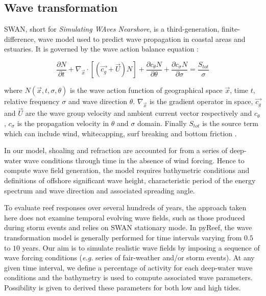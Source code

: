 \documentclass[default,jgrga]{agutex2015}
\begin{document}
\begin{article}
\subsection{Wave transformation}

SWAN, short for \textit{Simulating WAves Nearshore}, is a third-generation, finite-difference, wave model used to predict wave propagation in coastal areas and estuaries. It is governed by the wave action balance equation \citep{Bretherton68, Hasselmann73, Holthuijsen93, Booij99}:

\begin{equation}
 \frac{\partial N}{\partial t}+\nabla_{\vec{x}} \cdot \left[ \left( \vec{c_g} + \vec{U} \right) N \right] + \frac{\partial c_{\theta}N}{\partial \theta} + \frac{\partial c_{\sigma}N}{\partial \sigma} = \frac{S_{tot}}{\sigma}
\end{equation}

\noindent where $N(\vec{x},t,\sigma,\theta)$ is the wave action function of geographical space $\vec{x}$, time $t$, relative frequency $\sigma$ and wave direction $\theta$. $\nabla_{\vec{x}}$ is the gradient operator in space, $\vec{c_g}$ and $\vec{U}$ are the wave group velocity and ambient current vector respectively and $c_{\theta}$, $c_{\sigma}$ is the propagation velocity in $\theta$ and $\sigma$ domain. Finally $S_{tot}$ is the source term which can include wind, whitecapping, surf breaking and bottom friction \citep{Booij99}.

\noindent In our model, shoaling and refraction are accounted for from a series of deep-water wave conditions through time in the absence of wind forcing. Hence to compute wave field generation, the model requires bathymetric conditions and definitions of offshore significant wave height, characteristic period of the energy spectrum and wave direction and associated spreading angle.

\noindent To evaluate reef responses over several hundreds of years, the approach taken here does not examine temporal evolving wave fields, such as those produced during storm events and relies on SWAN stationary mode. In pyReef, the wave transformation model is generally performed for time intervals varying from $0.5$ to $10$ years. Our aim is to simulate realistic wave fields by imposing a sequence of wave forcing conditions (\textit{e.g.} series of fair-weather and/or storm events). At any given time interval, we define a percentage of activity for each deep-water wave conditions and the bathymetry is used to compute associated wave parameters. Possibility is given to derived these parameters for both low and high tides.


\end{article}
\end{document}
